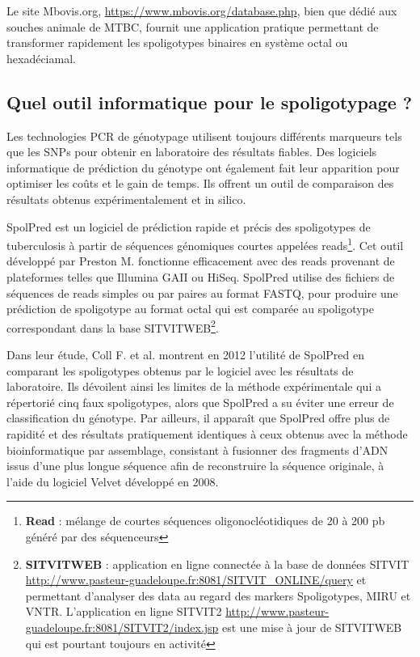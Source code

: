 \documentclass[twoside,a4paper,11pt,frenchb,openany]{report}
\begin{document}
Le site Mbovis.org, \url{https://www.mbovis.org/database.php}, bien que dédié aux souches animale de MTBC, fournit une application pratique permettant de transformer rapidement les spoligotypes binaires en système octal ou hexadéciamal.


\subsection{Quel outil informatique pour le spoligotypage ?}

Les technologies PCR de génotypage utilisent toujours différents marqueurs tels que les SNPs pour obtenir en laboratoire des résultats fiables. Des logiciels informatique de prédiction du génotype ont également fait leur apparition pour optimiser les coûts et le gain de temps. Ils offrent un outil de comparaison des résultats obtenus expérimentalement et in silico.

SpolPred est un logiciel de prédiction rapide et précis des spoligotypes de tuberculosis à partir de séquences génomiques courtes appelées reads\footnote{\textbf{Read} : mélange de courtes séquences oligonocléotidiques de 20 à 200 pb généré par des séquenceurs}. Cet outil développé par Preston M. fonctionne efficacement avec des reads provenant de plateformes telles que Illumina GAII ou HiSeq. SpolPred utilise des fichiers de séquences de reads simples ou par paires au format FASTQ, pour produire une prédiction de spoligotype au format octal qui est comparée au spoligotype correspondant dans la base SITVITWEB\footnote{\textbf{SITVITWEB} : application en ligne connectée à la base de données SITVIT \url{http://www.pasteur-guadeloupe.fr:8081/SITVIT_ONLINE/query} et permettant d'analyser des data au regard des markers Spoligotypes, MIRU et VNTR. L'application en ligne SITVIT2 \url{http://www.pasteur-guadeloupe.fr:8081/SITVIT2/index.jsp} est une mise à jour de SITVITWEB qui est pourtant toujours en activité}.

Dans leur étude, Coll F. et al.\cite{coll} montrent en 2012 l'utilité de SpolPred en comparant les spoligotypes obtenus par le logiciel avec les résultats de laboratoire. Ils dévoilent ainsi les limites de la méthode expérimentale qui a répertorié cinq faux spoligotypes, alors que SpolPred a su éviter une erreur de classification du génotype. Par ailleurs, il apparaît que SpolPred offre plus de rapidité et des résultats pratiquement identiques à ceux obtenus avec la méthode bioinformatique par assemblage, consistant à fusionner des fragments d'ADN issus d'une plus longue séquence afin de reconstruire la séquence originale, à l'aide du logiciel Velvet développé en 2008.
\end{document}
